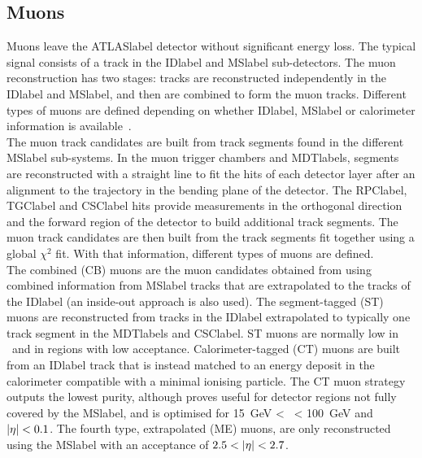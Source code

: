 \subsection{Muons}

Muons leave the \acrshort{ATLASlabel} detector without significant energy loss. The typical signal consists of a track in the \acrshort{IDlabel} and \acrshort{MSlabel} sub-detectors. The muon reconstruction has two stages: tracks are reconstructed independently in the \acrshort{IDlabel} and \acrshort{MSlabel}, and then are combined to form the muon tracks. Different types of muons are defined depending on whether \acrshort{IDlabel}, \acrshort{MSlabel} or calorimeter information is available~\cite{performancemu}.\\

The muon track candidates are built from track segments found in the different \acrshort{MSlabel} sub-systems. In the muon trigger chambers and \acrshort{MDTlabel}s, segments are reconstructed with a straight line to fit the hits of each detector layer after an alignment to the trajectory in the bending plane of the detector. The \acrshort{RPClabel}, \acrshort{TGClabel} and \acrshort{CSClabel} hits provide measurements in the orthogonal direction and the forward region of the detector to build additional track segments. The muon track candidates are then built from the track segments fit together using a global $\chi^2$ fit. With that information, different types of muons are defined.\\

The combined (CB) muons are the muon candidates obtained from using combined information from \acrshort{MSlabel} tracks that are extrapolated to the tracks of the \acrshort{IDlabel} (an inside-out approach is also used). The segment-tagged (ST) muons are reconstructed from tracks in the \acrshort{IDlabel} extrapolated to typically one track segment in the \acrshort{MDTlabel}s and \acrshort{CSClabel}. ST muons are normally low in \pT\ and in regions with low acceptance. Calorimeter-tagged (CT) muons are built from an \acrshort{IDlabel} track that is instead matched to an energy deposit in the calorimeter compatible with a minimal ionising particle. The CT muon strategy outputs the lowest purity, although proves useful for detector regions not fully covered by the \acrshort{MSlabel}, and is optimised for 15~GeV < \pT\ < 100~GeV and $\abs{\eta}<0.1$. The fourth type, extrapolated (ME) muons, are only reconstructed using the \acrshort{MSlabel} with an acceptance of $2.5 < \abs{\eta} < 2.7$.\\

